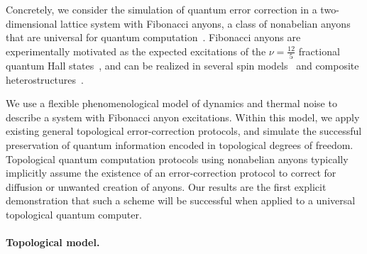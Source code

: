 \documentclass[aps, prl, letterpaper, twocolumn, superscriptaddress, notitlepage, 10pt]{revtex4}
\begin{document}
Concretely, we consider the simulation of quantum error correction in a two-dimensional lattice 
system with Fibonacci anyons, a class of nonabelian anyons that are universal for quantum 
computation~\cite{Freedman2002, Nayak2008}. Fibonacci anyons are experimentally motivated as the 
expected excitations of the $\nu=\frac{12}{5}$ fractional quantum Hall 
states~\cite{Slingerland2001}, and can be realized in several spin 
models~\cite{Levin2005, Bonesteel2012, Kapit2013, Palumbo2014} and composite 
heterostructures~\cite{Mong2014}.

We use a flexible phenomenological model of dynamics and thermal 
noise to describe a system with Fibonacci anyon excitations. Within 
this model, we apply existing general topological error-correction protocols, and 
simulate the successful preservation of quantum information encoded in topological 
degrees of freedom. Topological quantum computation protocols using nonabelian anyons 
typically implicitly assume the existence of an error-correction protocol to 
correct for diffusion or unwanted creation of anyons. Our results 
are the first explicit demonstration that such a scheme will 
be successful when applied to a universal topological quantum computer.

\paragraph{Topological model.}
\end{document}

